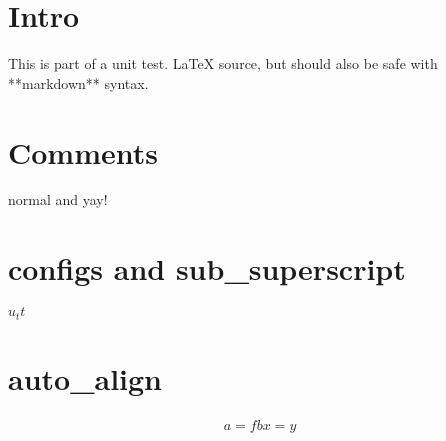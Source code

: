 \documentclass[12pt]{article}
\begin{document}
\section{Intro}
This is part of a unit test. \LaTeX{} source, but should also be safe with **markdown** syntax.

\section{Comments}
normal %
and
yay!

\section{configs and sub_superscript}
$u_tt$

\section{auto_align}
\begin {align}
a = fb
x = y
\end{align}
\end{document}
